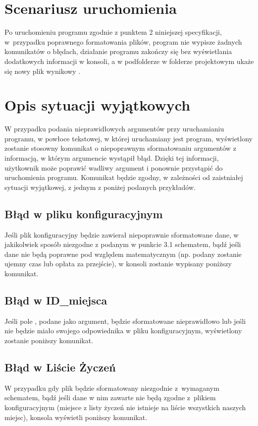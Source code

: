\documentclass[12pt,a4paper]{article}
\begin{document}
\section{Scenariusz uruchomienia}
Po uruchomieniu programu zgodnie z punktem 2 niniejszej specyfikacji, w~przypadku poprawnego formatowania plików, program nie wypisze żadnych komunikatów o błędach, działanie programu zakończy się bez wyświetlania dodatkowych informacji w konsoli, a w podfolderze  w folderze projektowym ukaże się nowy plik wynikowy .
\section{Opis sytuacji wyjątkowych}
W przypadku podania nieprawidłowych argumentów przy uruchamianiu programu, w powłoce tekstowej, w której uruchamiany jest program, wyświetlony zostanie stosowny komunikat o niepoprawnym sformatowaniu argumentów z informacją, w którym argumencie wystąpił błąd. Dzięki tej informacji, użytkownik może poprawić wadliwy argument i ponownie przystąpić do uruchomienia programu. Komunikat będzie zgodny, w zależności od zaistniałej sytuacji wyjątkowej, z jednym z poniżej podanych przykładów.
\subsection{Błąd w pliku konfiguracyjnym}
Jeśli plik konfiguracyjny będzie zawierał niepoprawnie sformatowane dane, w jakikolwiek sposób niezgodne z podanym w punkcie 3.1 schematem, bądź jeśli dane nie będą poprawne pod względem matematycznym (np. podany zostanie ujemny czas lub opłata za przejście), w konsoli zostanie wypisany poniższy komunikat.\\
{\footnotesize{}}
\subsection{Błąd w ID\_miejsca}
Jeśli pole , podane jako argument, będzie sformatowane nieprawidłowo lub jeśli nie będzie miało swojego odpowiednika w pliku konfiguracyjnym, wyświetlony zostanie poniższy komunikat.\\
\subsection{Błąd w Liście Życzeń}
W przypadku gdy plik  będzie sformatowany niezgodnie z~wymaganym schematem, bądź jeśli dane w nim zawarte nie będą zgodne z~plikiem konfiguracyjnym (miejsce z listy życzeń nie istnieje na liście wszystkich naszych miejsc), konsola wyświetli poniższy komunikat.\\
\end{document}
